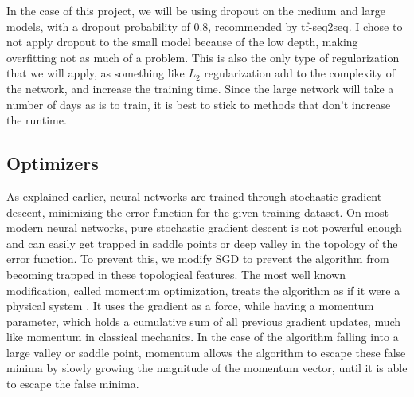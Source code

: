 \documentclass[pageno]{jpaper}
\begin{document}
\par
In the case of this project, we will be using dropout on the medium and large models, with a dropout probability of 0.8, recommended by tf-seq2seq.  I chose to not apply dropout to the small model because of the low depth, making overfitting not as much of a problem.  This is also the only type of regularization that we will apply, as something like $L_{2}$ regularization add to the complexity of the network, and increase the training time.  Since the large network will take a number of days as is to train, it is best to stick to methods that don't increase the runtime.

\subsection{Optimizers}
As explained earlier, neural networks are trained through stochastic gradient descent, minimizing the error function for the given training dataset.  On most modern neural networks, pure stochastic gradient descent is not powerful enough and can easily get trapped in saddle points or deep valley in the topology of the error function.  To prevent this, we modify SGD to prevent the algorithm from becoming trapped in these topological features.  The most well known modification, called momentum optimization, treats the algorithm as if it were a physical system \cite{sutskever:2013}.  It uses the gradient as a force, while having a momentum parameter, which holds a cumulative sum of all previous gradient updates, much like momentum in classical mechanics.  In the case of the algorithm falling into a large valley or saddle point, momentum allows the algorithm to escape these false minima by slowly growing the magnitude of the momentum vector, until it is able to escape the false minima.
\end{document}
